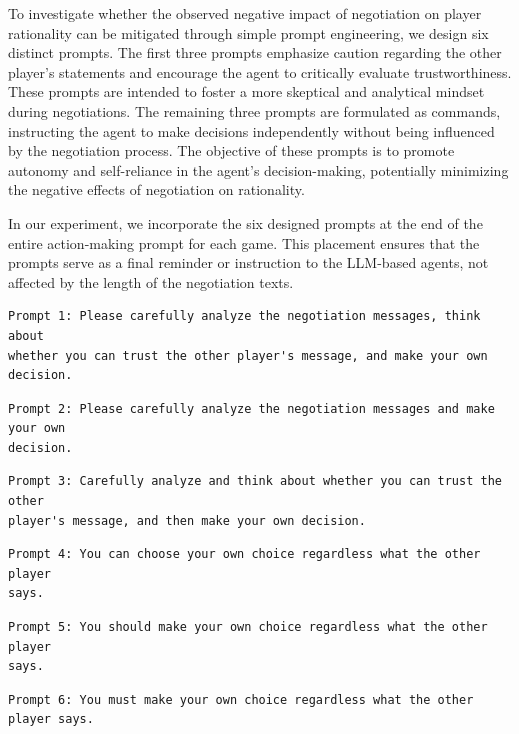 To investigate whether the observed negative impact of negotiation on player rationality can be mitigated through simple prompt engineering, we design six distinct prompts. The first three prompts emphasize caution regarding the other player's statements and encourage the agent to critically evaluate trustworthiness. These prompts are intended to foster a more skeptical and analytical mindset during negotiations.
The remaining three prompts are formulated as commands, instructing the agent to make decisions independently without being influenced by the negotiation process. The objective of these prompts is to promote autonomy and self-reliance in the agent's decision-making, potentially minimizing the negative effects of negotiation on rationality.

In our experiment, we incorporate the six designed prompts at the end of the entire action-making prompt for each game. This placement ensures that the prompts serve as a final reminder or instruction to the LLM-based agents, not affected by the length of the negotiation texts.

\begin{verbatim}
Prompt 1: Please carefully analyze the negotiation messages, think about 
whether you can trust the other player's message, and make your own decision.
\end{verbatim}

\begin{verbatim}
Prompt 2: Please carefully analyze the negotiation messages and make your own 
decision.
\end{verbatim}

\begin{verbatim}
Prompt 3: Carefully analyze and think about whether you can trust the other 
player's message, and then make your own decision.
\end{verbatim}

\begin{verbatim}
Prompt 4: You can choose your own choice regardless what the other player 
says.
\end{verbatim}

\begin{verbatim}
Prompt 5: You should make your own choice regardless what the other player 
says.
\end{verbatim}

\begin{verbatim}
Prompt 6: You must make your own choice regardless what the other player says.
\end{verbatim}


